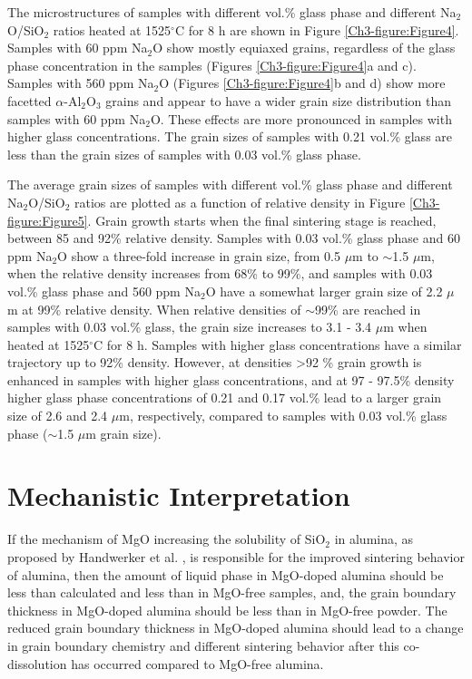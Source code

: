 The microstructures of samples with different vol.\% glass phase and different Na$_{2}$O/SiO$_{2}$ ratios heated at 1525$^{\circ}$C for 8 h are shown in Figure \ref{Ch3-figure:Figure4}. Samples with 60 ppm Na$_{2}$O show mostly equiaxed grains, regardless of the glass phase concentration in the samples (Figures \ref{Ch3-figure:Figure4}a and c). Samples with 560 ppm Na$_{2}$O (Figures  \ref{Ch3-figure:Figure4}b and d) show more facetted $\alpha$-Al$_{2}$O$_{3}$ grains and appear to have a wider grain size distribution than samples with 60 ppm Na$_{2}$O. These effects are more pronounced in samples with higher glass concentrations. The grain sizes of samples with 0.21 vol.\% glass are less than the grain sizes of samples with 0.03 vol.\% glass phase. 

The average grain sizes of samples with different vol.\% glass phase and different Na$_{2}$O/SiO$_{2}$ ratios are plotted as a function of relative density in Figure \ref{Ch3-figure:Figure5}. Grain growth starts when the final sintering stage is reached, between 85 and 92\% relative density. Samples with 0.03 vol.\% glass phase and 60 ppm Na$_{2}$O show a three-fold increase in grain size, from 0.5 $\mu$m to $\sim$1.5 $\mu$m, when the relative density increases from 68\% to 99\%, and samples with 0.03 vol.\% glass phase and 560 ppm Na$_{2}$O have a somewhat larger grain size of 2.2 $\mu$m at 99\% relative density. When relative densities of $\sim$99\% are reached in samples with 0.03 vol.\% glass, the grain size increases to 3.1 - 3.4 $\mu$m when heated at 1525$^{\circ}$C for 8 h. Samples with higher glass concentrations have a similar trajectory up to 92\% density. However, at densities >92 \% grain growth is enhanced in samples with higher glass concentrations, and at 97 - 97.5\% density higher glass phase concentrations of 0.21 and 0.17 vol.\% lead to a larger grain size of 2.6 and 2.4 $\mu$m, respectively, compared to samples with 0.03 vol.\% glass phase ($\sim$1.5 $\mu$m grain size). 

\section{Mechanistic Interpretation}

If the mechanism of MgO increasing the solubility of SiO$_{2}$ in alumina, as proposed by Handwerker et al. \cite{Handwerker1989}, is responsible for the improved sintering behavior of alumina, then the amount of liquid phase in MgO-doped alumina should be less than calculated and less than in MgO-free samples, and, the grain boundary thickness in MgO-doped alumina should be less than in MgO-free powder. The reduced grain boundary thickness in MgO-doped alumina should lead to a change in grain boundary chemistry and different sintering behavior after this co-dissolution has occurred compared to MgO-free alumina. 

